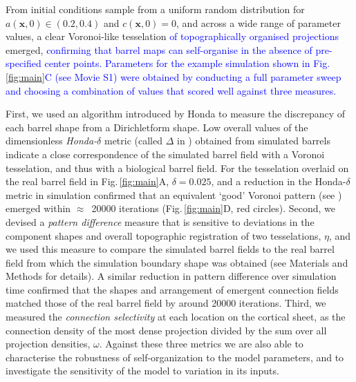 \documentclass[9pt,lineno]{elife}
\newcommand{\cmnt}[1]{\textcolor{blue}{#1}}
\newcommand{\MPtwo}[1]{\textcolor{revblue}{#1}}
\newcommand{\metrics}[1]{\textcolor{revred}{#1}}
\newcommand{\mb}[1]{\mathbf{#1}}
\begin{document}
From initial conditions sample from a uniform random distribution for
$a(\mb{x},0)\in(0.2,0.4)$ and $c(\mb{x},0)=0$, and across a wide range of
parameter values,
a clear Voronoi-like tesselation \cmnt{of topographically organised
  projections} emerged, \cmnt{confirming that barrel maps can self-organise in
  the absence of pre-specified center points. Parameters for the example
  simulation shown in Fig.\,\ref{fig:main}C (see Movie S1) were obtained by
  conducting a full parameter sweep and choosing a combination of values that
  scored well against three measures.}

\metrics{First, we used an algorithm introduced by Honda to measure the
  discrepancy of each barrel shape from a Dirichletform shape. Low overall
  values of the dimensionless \emph{Honda-}$\delta$ metric (called $\Delta$
  in}
\citealp{honda_geometrical_1983}) \metrics{obtained from simulated barrels indicate a close
  correspondence of the simulated barrel field with a Voronoi tesselation, and
  thus with a biological barrel field. For the
  tesselation overlaid on the real barrel field in Fig.\,\ref{fig:main}A,
  $\delta=0.025$, and a reduction in the Honda-$\delta$ metric in simulation
  confirmed that an equivalent `good' Voronoi pattern} (see
\citealp{senft_mouse_1991}) \metrics{emerged within $\approx$~20000 iterations
  (Fig.\,\ref{fig:main}D, red circles). Second, we devised a \emph{pattern
    difference} measure that is sensitive to deviations in the component
  shapes and overall topographic registration of two tesselations, $\eta$, and
  we used this measure to compare the simulated barrel fields to the real
  barrel field from which the simulation boundary shape was obtained (see
  Materials and Methods for details). A similar reduction in pattern
  difference over simulation time confirmed that the shapes and arrangement of
  emergent connection fields matched those of the real barrel field by around
  20000 iterations. Third, we measured the \emph{connection selectivity} at
  each location on the cortical sheet, as the connection density of the most
  dense projection divided by the sum over all projection densities,
  $\omega$.}
%
\metrics{Against these three metrics we are also able to characterise the
  robustness of self-organization to the model parameters, and to investigate
  the sensitivity of the model to variation in its inputs.}
\end{document}
